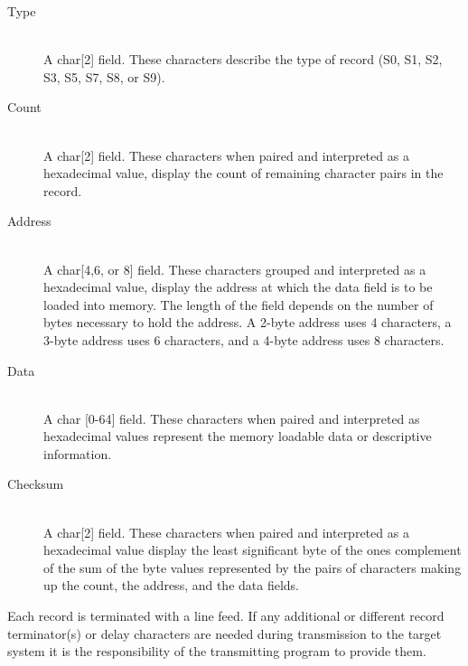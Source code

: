             \begin{description}
                \item[Type]~\\
                    A char[2] field. These characters describe the type of record (S0, S1, S2, S3, S5, S7, S8, or S9).

                \item[Count]~\\
                    A char[2] field. These characters when paired and interpreted as a hexadecimal value, display the count of remaining character pairs in the record.

                \item[Address]~\\
                    A char[4,6, or 8] field. These characters grouped and interpreted as a hexadecimal value, display the address at which the data field is to be loaded into memory. The length of the field depends on the number of bytes necessary to hold the address. A 2-byte address uses 4 characters, a 3-byte address uses 6 characters, and a 4-byte address uses 8 characters.

                \item[Data]~\\
                    A char [0-64] field. These characters when paired and interpreted as hexadecimal values represent the memory loadable data or descriptive information.

                \item[Checksum]~\\
                    A char[2] field. These characters when paired and interpreted as a hexadecimal value display the least significant byte of the ones complement of the sum of the byte values represented by the pairs of characters making up the count, the address, and the data fields.
            \end{description}

            Each record is terminated with a line feed. If any additional or different record terminator(s) or delay characters are needed during transmission to the target system it is the responsibility of the transmitting program to provide them.

